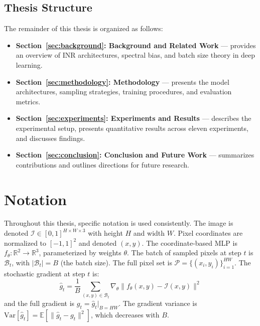 \documentclass[a4paper,oneside,11pt,english]{scrartcl}
\begin{document}
\subsection{Thesis Structure}

The remainder of this thesis is organized as follows:

\begin{itemize}
    \item \textbf{Section~\ref{sec:background}: Background and Related Work} ---
          provides an overview of INR architectures, spectral bias, and batch
          size theory in deep learning.
    \item \textbf{Section~\ref{sec:methodology}: Methodology} --- presents the
          model architectures, sampling strategies, training procedures, and
          evaluation metrics.
    \item \textbf{Section~\ref{sec:experiments}: Experiments and Results} ---
          describes the experimental setup, presents quantitative results
          across eleven experiments, and discusses findings.
    \item \textbf{Section~\ref{sec:conclusion}: Conclusion and Future Work} ---
          summarizes contributions and outlines directions for future research.
\end{itemize}


\section{Notation}
\label{sec:notation}

Throughout this thesis, specific notation is used consistently.
The image is denoted $\mathcal{I} \in [0,1]^{H \times W \times 3}$ with height
$H$ and width $W$.  Pixel coordinates are normalized to $[-1,1]^2$ and denoted
$(x, y)$.  The coordinate-based MLP is $f_\theta\colon \mathbb{R}^2 \to
\mathbb{R}^3$, parameterized by weights $\theta$.  The batch of sampled pixels
at step $t$ is $\mathcal{B}_t$, with $|\mathcal{B}_t| = B$ (the batch size).
The full pixel set is $\mathcal{P} = \{(x_i, y_i)\}_{i=1}^{HW}$.  The
stochastic gradient at step $t$ is:
\begin{equation}
    \hat{g}_t = \frac{1}{B} \sum_{(x,y) \in \mathcal{B}_t}
    \nabla_\theta \bigl\| f_\theta(x, y) - \mathcal{I}(x, y) \bigr\|^2
\end{equation}
and the full gradient is $g_t = \hat{g}_t \big|_{B = HW}$.  The gradient
variance is $\text{Var}[\hat{g}_t] = \mathbb{E}[\|\hat{g}_t - g_t\|^2]$,
which decreases with $B$.
\end{document}
